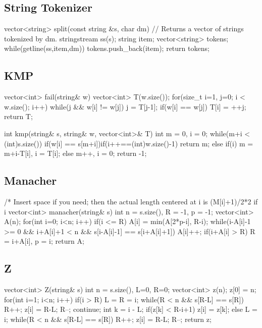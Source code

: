 \subsection{String Tokenizer}
\begin{cpp}
vector<string> split(const string &s, char dm){
  // Returns a vector of strings tokenized by dm.
  stringstream ss(s);
  string item; vector<string> tokens;
  while(getline(ss,item,dm)) tokens.push_back(item);
  return tokens;
}
\end{cpp}

\subsection{KMP}
\begin{cpp}
vector<int> fail(string& w){
  vector<int> T(w.size());
  for(size_t i=1, j=0; i < w.size(); i++){
    while(j && w[i] != w[j]) j = T[j-1];
    if(w[i] == w[j]) T[i] = ++j;
  }
  return T;
}

int kmp(string& s, string& w, vector<int>& T){
  int m = 0, i = 0;
  while(m+i < (int)s.size()){
    if(w[i] == s[m+i]){if(i++==(int)w.size()-1) return m;}
    else if(i) m = m+i-T[i], i = T[i];
    else m++, i = 0;
  }
  return -1;
}
\end{cpp}

\subsection{Manacher}
\begin{cpp}
/* Insert space if you need; then
the actual length centered at i is
(M[i]+1)/2*2 if i%
vector<int> manacher(string& s){
  int n = s.size(), R = -1, p = -1;
  vector<int> A(n);
  for(int i=0; i<n; i++){
    if(i <= R) A[i] = min(A[2*p-i], R-i);
    while(i-A[i]-1 >= 0 && i+A[i]+1 < n &&
      s[i-A[i]-1] == s[i+A[i]+1]) A[i]++;
    if(i+A[i] > R) R = i+A[i], p = i;
  }
  return A;
}
\end{cpp}

\subsection{Z}
\begin{cpp}
vector<int> Z(string& s){
  int n = s.size(), L=0, R=0;
  vector<int> z(n); z[0] = n;
  for(int i=1; i<n; i++){
    if(i > R){
      L = R = i;
      while(R < n && s[R-L] == s[R]) R++;
      z[i] = R-L; R--;
      continue;
    }
    int k = i - L;
    if(z[k] < R-i+1) z[i] = z[k];
    else{
      L = i;
      while(R < n && s[R-L] == s[R]) R++;
      z[i] = R-L; R--;
    }
  }
  return z;
}
\end{cpp}


